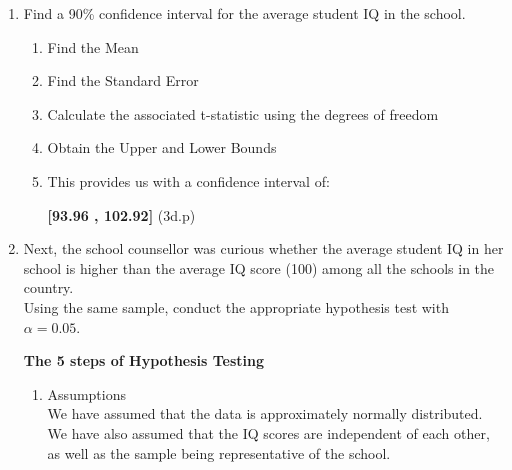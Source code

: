 \documentclass[12pt,letterpaper]{article}
\begin{document}
\begin{enumerate}
	\item Find a 90\% confidence interval for the average student IQ in the school.\\
	
		
	\begin{enumerate}[label=(\alph*)]
		\item Find the Mean
		
			  			
		
		\item Find the Standard Error
					  
					
		\item Calculate the associated t-statistic using the degrees of freedom
					  
					
					
		\item Obtain the Upper and Lower Bounds
					  
					
					  
					
		\item This provides us with a confidence interval of:
		
		\textbf{ [93.96 , 102.92]} (3d.p)
	\end{enumerate}
	
	
	
	
	
	\item Next, the school counsellor was curious  whether  the average student IQ in her school is higher than the average IQ score (100) among all the schools in the country.\\ 
	
	\noindent Using the same sample, conduct the appropriate hypothesis test with $\alpha=0.05$.
	
	
	
\textbf{The 5 steps of Hypothesis Testing}
		\begin{enumerate}[label=(\alph*)]
	
		\item Assumptions\\
				We have assumed that the data is approximately normally distributed.\\
				We have also assumed that the IQ scores are independent of each other, as well as the sample being representative of the school.\\
				

\end{enumerate}
\end{enumerate}
\end{document}
